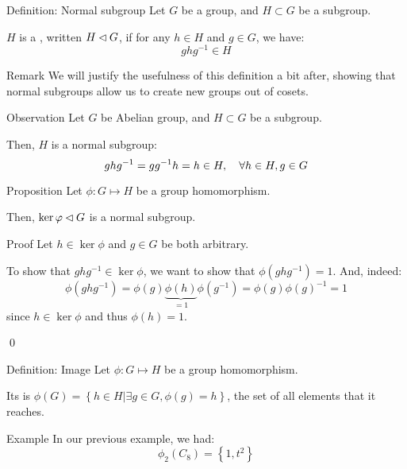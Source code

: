 \documentclass[a4paper]{article}
\begin{document}
\begin{parag}{Definition: Normal subgroup}
    Let $G$ be a group, and $H \subset G$ be a subgroup.

    $H$ is a , written $H \lhd G$, if for any $h \in H$ and $g \in G$, we have:
    \[g h g^{-1} \in H\]

    \begin{subparag}{Remark}
        We will justify the usefulness of this definition a bit after, showing that normal subgroups allow us to create new groups out of cosets.
    \end{subparag}

    \begin{subparag}{Observation}
        Let $G$ be Abelian group, and $H \subset G$ be a subgroup.

        Then, $H$ is a normal subgroup: 
        \[g h g^{-1} = g g^{-1} h = h \in H, \quad \forall h \in H, g \in G\]
    \end{subparag}
\end{parag}

\begin{parag}{Proposition}
    Let $\phi: G \mapsto H$ be a group homomorphism.

    Then, $\ker \varphi \lhd G$ is a normal subgroup.

    \begin{subparag}{Proof}
        Let $h \in \ker \phi$ and $g \in G$ be both arbitrary.

        To show that $g h g^{-1} \in \ker \phi$, we want to show that $\phi\left(g h g^{-1}\right) = 1$. And, indeed:
        \[\phi\left(g h g^{-1}\right) = \phi\left(g\right)\underbrace{\phi\left(h\right)}_{= 1}\phi\left(g^{-1}\right) = \phi\left(g\right)\phi\left(g\right)^{-1} = 1\]
        since $h \in \ker \phi$ and thus $\phi\left(h\right) = 1$.

        \qed
    \end{subparag}
\end{parag}

\begin{parag}{Definition: Image}
    Let $\phi: G \mapsto H$ be a group homomorphism.

    Its  is $\phi\left(G\right) = \left\{h \in H | \exists g \in G, \phi\left(g\right) = h\right\}$, the set of all elements that it reaches.

    \begin{subparag}{Example}
        In our previous example, we had: 
        \[\phi_2\left(C_8\right) = \left\{1, t^2\right\}\]
        
    \end{subparag}
    
\end{parag}
\end{document}
